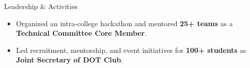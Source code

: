 \documentclass{resume}
\begin{document}
\begin{experienceSection}{Leadership \& Activities}

    \begin{itemize}
        \itemsep -6pt {}

        \item Organized an intra-college hackathon and mentored \textbf{25+ teams} as a \textbf{Technical Committee Core Member}.

        \item Led recruitment, mentorship, and event initiatives for \textbf{100+ students} as \textbf{Joint Secretary of DOT Club}.

    \end{itemize}

\end{experienceSection}
\end{document}
